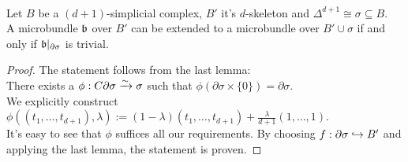 \\ Let $B$ be a $(d + 1)$-simplicial complex, $B'$ it's $d$-skeleton and $\Delta^{d + 1} \cong \sigma \subseteq B$.
\\ A microbundle $\mathfrak{b}$ over $B'$ can be extended to a microbundle over $B' \cup \sigma$ if and only if $\mathfrak{b} \vert_{\partial \sigma}$ is trivial.
\begin{proof}
The statement follows from the last lemma:
\\ There exists a $\phi: C\partial \sigma \xrightarrow{\sim} \sigma$ such that $\phi(\partial \sigma \times \{0\}) = \partial \sigma$.
\\ We explicitly construct $\phi((t_1, \dots, t_{d + 1}), \lambda) := (1 - \lambda) (t_1, \dots, t_{d + 1}) + \frac{\lambda}{d + 1} (1, \dots, 1)$.
\\ It's easy to see that $\phi$ suffices all our requirements. By choosing $f: \partial \sigma \hookrightarrow{} B'$ and applying the last lemma, the statement is proven.
\end{proof}